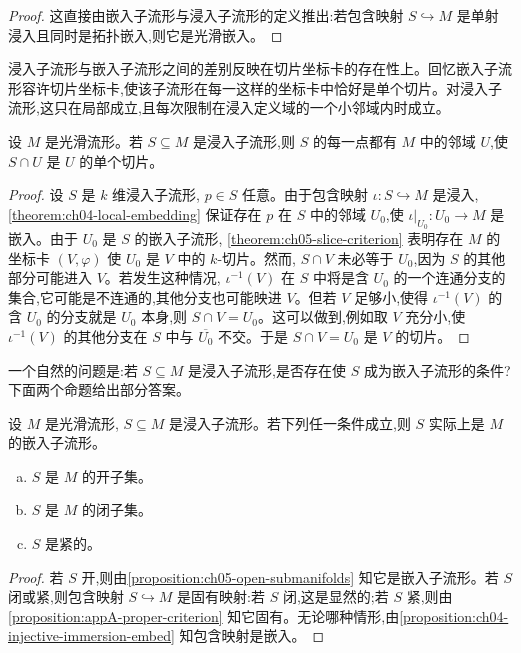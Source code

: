 \documentclass[../../main.tex]{subfiles}
\begin{document}
\begin{proof}
这直接由嵌入子流形与浸入子流形的定义推出:若包含映射 $S\hookrightarrow M$ 是单射浸入且同时是拓扑嵌入,则它是光滑嵌入。
\end{proof}

浸入子流形与嵌入子流形之间的差别反映在切片坐标卡的存在性上。回忆嵌入子流形容许切片坐标卡,使该子流形在每一这样的坐标卡中恰好是单个切片。对浸入子流形,这只在局部成立,且每次限制在浸入定义域的一个小邻域内时成立。

\begin{proposition}\label{proposition:ch05-immersed-slice-local}
设 $M$ 是光滑流形。若 $S\subseteq M$ 是浸入子流形,则 $S$ 的每一点都有 $M$ 中的邻域 $U$,使 $S\cap U$ 是 $U$ 的单个切片。
\end{proposition}

\begin{proof}
设 $S$ 是 $k$ 维浸入子流形, $p\in S$ 任意。由于包含映射 $\iota:S\hookrightarrow M$ 是浸入, \cref{theorem:ch04-local-embedding} 保证存在 $p$ 在 $S$ 中的邻域 $U_0$,使 $\iota|_{U_0}:U_0\to M$ 是嵌入。由于 $U_0$ 是 $S$ 的嵌入子流形, \cref{theorem:ch05-slice-criterion} 表明存在 $M$ 的坐标卡 $(V,\varphi)$ 使 $U_0$ 是 $V$ 中的 $k$-切片。然而, $S\cap V$ 未必等于 $U_0$,因为 $S$ 的其他部分可能进入 $V$。若发生这种情况, $\iota^{-1}(V)$ 在 $S$ 中将是含 $U_0$ 的一个连通分支的集合,它可能是不连通的,其他分支也可能映进 $V$。但若 $V$ 足够小,使得 $\iota^{-1}(V)$ 的含 $U_0$ 的分支就是 $U_0$ 本身,则 $S\cap V=U_0$。这可以做到,例如取 $V$ 充分小,使 $\iota^{-1}(V)$ 的其他分支在 $S$ 中与 $\overline{U_0}$ 不交。于是 $S\cap V=U_0$ 是 $V$ 的切片。
\end{proof}

一个自然的问题是:若 $S\subseteq M$ 是浸入子流形,是否存在使 $S$ 成为嵌入子流形的条件?下面两个命题给出部分答案。

\begin{proposition}\label{proposition:ch05-immersed-embedded-criteria}
设 $M$ 是光滑流形, $S\subseteq M$ 是浸入子流形。若下列任一条件成立,则 $S$ 实际上是 $M$ 的嵌入子流形。
\begin{enumerate}[(a)]
\item $S$ 是 $M$ 的开子集。
\item $S$ 是 $M$ 的闭子集。
\item $S$ 是紧的。
\end{enumerate}
\end{proposition}

\begin{proof}
若 $S$ 开,则由\cref{proposition:ch05-open-submanifolds} 知它是嵌入子流形。若 $S$ 闭或紧,则包含映射 $S\hookrightarrow M$ 是固有映射:若 $S$ 闭,这是显然的;若 $S$ 紧,则由\cref{proposition:appA-proper-criterion} 知它固有。无论哪种情形,由\cref{proposition:ch04-injective-immersion-embed} 知包含映射是嵌入。
\end{proof}
\end{document}
